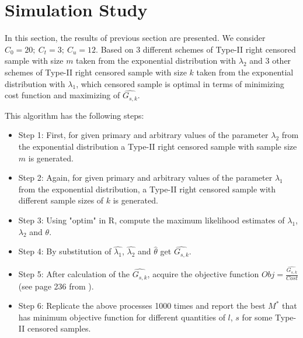 \documentclass[twoside]{article}
\begin{document}
\section{\bf Simulation Study}\label{section3}
In this section, the results of previous section  are presented. We consider $C_0=20;\  C_t=3; \  C_u=12$. Based on  $3$ different schemes of   Type-II right  censored sample with size $m$ taken from the exponential distribution with $\lambda_2$ and $3$ other schemes of Type-II right  censored  sample with size $k$ taken from the exponential distribution with $\lambda_1$,  which censored sample  is optimal in terms of   minimizing  cost function and   maximizing of $\widehat{G_{s,k}}$.
\begin{alg}\label{alg1}
 This algorithm has the following steps:
\begin{itemize}
\item
Step 1:  
   First, for given primary and arbitrary  values of the parameter  $\lambda_2$ from the exponential distribution  a Type-II right censored sample with sample size $m$ is generated.\\
\item 
Step 2:
Again,  for given primary and arbitrary  values of the parameter  $\lambda_1$ from the exponential distribution, a Type-II right  censored sample with different sample sizes of $k$ is generated.\\
\item
Step 3: 
Using "optim" in R,  compute the  maximum likelihood estimates of $\lambda_1$, $\lambda_2$ and $\theta$.\\
\item 
Step 4:   
 By substitution of $\widehat{\lambda_1}$, $\widehat{\lambda_2}$ and $\widehat{\theta}$  get  $\widehat{G_{s,k}}$.\\
\item
Step 5: 
After calculation of the  $\widehat{G_{s,k}}$, acquire  the  objective function $Obj=\frac{\widehat{G_{s,k}}}{Cost}$ (see page 236 from \cite{PakdamanAhmadi2019} ).\\
\item 
Step 6:
Replicate the above processes 1000 times and report  the  best $M^*$  that has minimum   objective function for different quantities of $l$, $s$ for  some Type-II   censored samples.\\
\end{itemize}
\end{alg}
\end{document}
